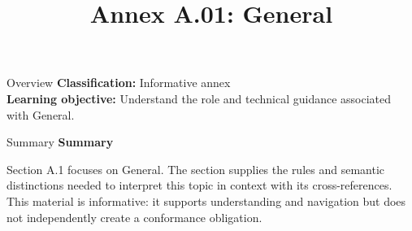 \documentclass[10pt,letterpaper]{article}
\title{Annex A.01: General}
\author{}
\date{}
\begin{document}
\maketitle
\begin{CornellOverviewBox}{Overview}
\textbf{Classification:} Informative annex\\[2pt]
\textbf{Learning objective:} Understand the role and technical guidance associated with General.
\end{CornellOverviewBox}\begin{CornellSummaryBox}{Summary}
{\sffamily\bfseries\color{Accent} Summary}\par\vspace{3pt}Section A.1 focuses on General. The section supplies the rules and semantic distinctions needed to interpret this topic in context with its cross-references. This material is informative: it supports understanding and navigation but does not independently create a conformance obligation.
\end{CornellSummaryBox}
\end{document}
